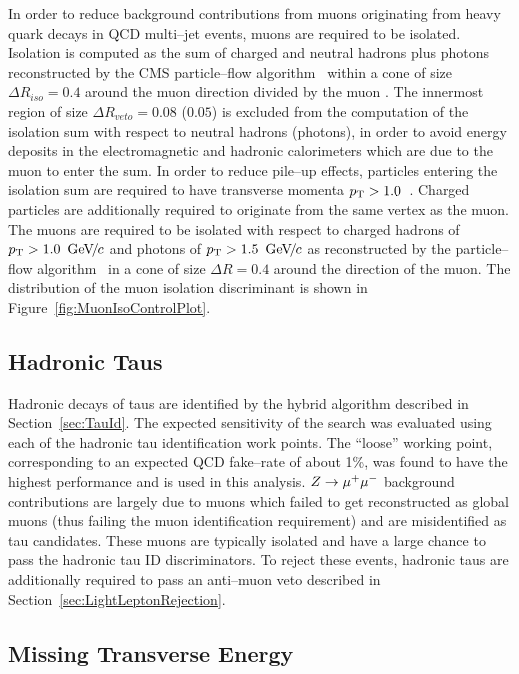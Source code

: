 In order to reduce background contributions from muons originating from heavy
quark decays in QCD multi--jet events, muons are required to be isolated.
Isolation is computed as the \pt sum of charged and neutral hadrons plus photons
reconstructed by the CMS particle--flow algorithm~\cite{CMS-PAS-PFT-09-001}
within a cone of size $\Delta R_{iso} = 0.4$ around the muon direction divided
by the muon \pt.  The
innermost region of size $\Delta R_{veto} = 0.08$ ($0.05$) is excluded from the
computation of the isolation \pt sum with respect to neutral hadrons (photons),
in order to avoid energy deposits in the electromagnetic and hadronic
calorimeters which are due to the muon to enter the sum.  In order to reduce
pile--up effects, particles entering the isolation \pt sum are required to have
transverse momenta $p_{\mathrm{T}} > 1.0$~\GeVc.  Charged particles are additionally
required to originate from the same vertex as the muon.  The muons are required
to be isolated with respect to charged hadrons of $p_{\mathrm{T}} > 1.0~{\,\text{Ge\hspace{-.08em}V\hspace{-0.16em}/\hspace{-0.08em}}c}$ and photons
of $p_{\mathrm{T}} > 1.5~{\,\text{Ge\hspace{-.08em}V\hspace{-0.16em}/\hspace{-0.08em}}c}$ as reconstructed by the particle--flow
algorithm~\cite{CMS-PAS-PFT-09-001} in a cone of size $\Delta R = 0.4$ around
the direction of the muon.  The distribution of the muon isolation discriminant
is shown in Figure~\ref{fig:MuonIsoControlPlot}.

\subsection{Hadronic Taus}

Hadronic decays of taus are identified by the \hpsTanc hybrid algorithm
described in Section~\ref{sec:TauId}.  The expected sensitivity of the search
was evaluated using each of the hadronic tau identification work points.  The
``loose'' working point, corresponding to an expected QCD fake--rate of about
1\%, was found to have the highest performance and is used in this analysis.  $Z
\to \mu^+\mu^-$ background contributions are largely due to muons which failed to get
reconstructed as global muons (thus failing the muon identification requirement)
and are misidentified as tau candidates.  These muons are typically
isolated and have a large chance to pass the hadronic tau ID discriminators.  To
reject these events, hadronic taus are additionally required to pass an
anti--muon veto described in Section~\ref{sec:LightLeptonRejection}. 

\subsection{Missing Transverse Energy}

